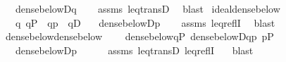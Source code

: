 \begin{isabellebody}
\ \ \ {\isachardoublequoteopen}dense{\isacharunderscore}{\kern0pt}below{\isacharparenleft}{\kern0pt}D{\isacharcomma}{\kern0pt}q{\isacharparenright}{\kern0pt}{\isachardoublequoteclose}\isanewline
%
\isadelimproof
\ \ %
\endisadelimproof
%
\isatagproof
{}\isamarkupfalse%
\ assms\ leq{\isacharunderscore}{\kern0pt}transD\ \isamarkupfalse%
\ blast%
\endisatagproof
{\isafoldproof}%
%
\isadelimproof
\isanewline
%
\endisadelimproof
\isanewline
{}\isamarkupfalse%
\ ideal{\isacharunderscore}{\kern0pt}dense{\isacharunderscore}{\kern0pt}below{\isacharcolon}{\kern0pt}\isanewline
\ \ \ {\isachardoublequoteopen}{\isasymAnd}q{\isachardot}{\kern0pt}\ q{\isasymin}P\ {\isasymLongrightarrow}\ q{\isasympreceq}p\ {\isasymLongrightarrow}\ q{\isasymin}D{\isachardoublequoteclose}\isanewline
\ \ \ {\isachardoublequoteopen}dense{\isacharunderscore}{\kern0pt}below{\isacharparenleft}{\kern0pt}D{\isacharcomma}{\kern0pt}p{\isacharparenright}{\kern0pt}{\isachardoublequoteclose}\isanewline
%
\isadelimproof
\ \ %
\endisadelimproof
%
\isatagproof
{}\isamarkupfalse%
\ assms\ leq{\isacharunderscore}{\kern0pt}reflI\ \isamarkupfalse%
\ blast%
\endisatagproof
{\isafoldproof}%
%
\isadelimproof
\isanewline
%
\endisadelimproof
\isanewline
{}\isamarkupfalse%
\ dense{\isacharunderscore}{\kern0pt}below{\isacharunderscore}{\kern0pt}dense{\isacharunderscore}{\kern0pt}below{\isacharcolon}{\kern0pt}\ \isanewline
\ \ \ {\isachardoublequoteopen}dense{\isacharunderscore}{\kern0pt}below{\isacharparenleft}{\kern0pt}{\isacharbraceleft}{\kern0pt}q{\isasymin}P{\isachardot}{\kern0pt}\ dense{\isacharunderscore}{\kern0pt}below{\isacharparenleft}{\kern0pt}D{\isacharcomma}{\kern0pt}q{\isacharparenright}{\kern0pt}{\isacharbraceright}{\kern0pt}{\isacharcomma}{\kern0pt}p{\isacharparenright}{\kern0pt}{\isachardoublequoteclose}\ {\isachardoublequoteopen}p{\isasymin}P{\isachardoublequoteclose}\ \isanewline
\ \ \ {\isachardoublequoteopen}dense{\isacharunderscore}{\kern0pt}below{\isacharparenleft}{\kern0pt}D{\isacharcomma}{\kern0pt}p{\isacharparenright}{\kern0pt}{\isachardoublequoteclose}\ \ \isanewline
%
\isadelimproof
\ \ %
\endisadelimproof
%
\isatagproof
{}\isamarkupfalse%
\ assms\ leq{\isacharunderscore}{\kern0pt}transD\ leq{\isacharunderscore}{\kern0pt}reflI\ \ \isamarkupfalse%
\ blast%
\endisatagproof
{\isafoldproof}%
%
\isadelimproof
\isanewline
%
\endisadelimproof
\ \ \ \ \isanewline
\ \ \ \ \isanewline

\end{isabellebody}
